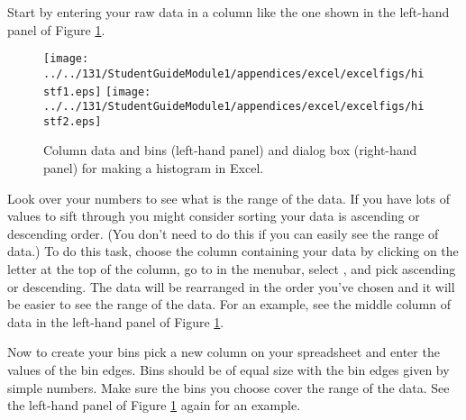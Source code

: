 Start by entering your raw data in a column like the one shown in the left-hand panel of Figure \ref{hist2}.
\begin{figure}[b!]
\begin{center}
\texttt{[image: ../../131/StudentGuideModule1/appendices/excel/excelfigs/histf1.eps]}
\hspace{0.4in}
\texttt{[image: ../../131/StudentGuideModule1/appendices/excel/excelfigs/histf2.eps]}
\caption{Column data and bins (left-hand panel) and dialog box (right-hand panel)  for making a histogram in Excel.}\label{hist2}
\end{center}
\end{figure}
Look over your numbers to see what is the range of the data.
If you have lots of values to sift through you might consider sorting your data is ascending or descending order.
(You don't need to do this if you can easily see the range of data.)
To do this task, choose the column containing your data by clicking on the letter at the top of the column, 
go to  in the menubar, select , and pick
ascending or descending.
The data will be rearranged in the order you've chosen and it will be easier to see the range of the data.
For an example, see the middle column of data in the left-hand panel of Figure \ref{hist2}.


Now to create your bins pick a new column on your spreadsheet and enter the values of the bin edges.
Bins should be of equal size with the bin edges given by simple numbers.
Make sure the bins you choose cover the range of the data. 
See the left-hand panel of Figure \ref{hist2} again for an example.

\newpage

